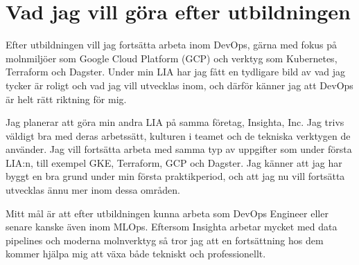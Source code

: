\section{Vad jag vill göra efter utbildningen}
\label{sec:framtida_planer}

Efter utbildningen vill jag fortsätta arbeta inom DevOps, gärna med fokus på molnmiljöer som Google Cloud Platform (GCP) och verktyg som Kubernetes, Terraform och Dagster. Under min LIA har jag fått en tydligare bild av vad jag tycker är roligt och vad jag vill utvecklas inom, och därför känner jag att DevOps är helt rätt riktning för mig.

Jag planerar att göra min andra LIA på samma företag, Insighta, Inc. Jag trivs väldigt bra med deras arbetssätt, kulturen i teamet och de tekniska verktygen de använder. Jag vill fortsätta arbeta med samma typ av uppgifter som under första LIA:n, till exempel GKE, Terraform, GCP och Dagster. Jag känner att jag har byggt en bra grund under min första praktikperiod, och att jag nu vill fortsätta utvecklas ännu mer inom dessa områden.

Mitt mål är att efter utbildningen kunna arbeta som DevOps Engineer eller senare kanske även inom MLOps. Eftersom Insighta arbetar mycket med data pipelines och moderna molnverktyg så tror jag att en fortsättning hos dem kommer hjälpa mig att växa både tekniskt och professionellt.
